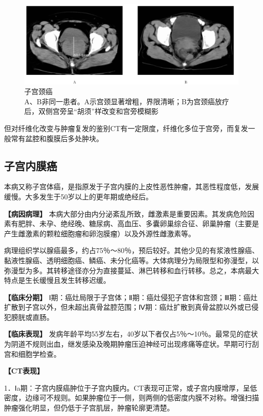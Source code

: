 \begin{figure}[!htbp]
 \centering
 \includegraphics[width=.7\textwidth,height=\textheight,keepaspectratio]{./images/Image00407.jpg}
 \captionsetup{justification=centering}
 \caption{子宫颈癌\\{\small A、B非同一患者。A示宫颈显著增粗，界限清晰；B为宫颈癌放疗后，双侧宫旁呈“胡须”样改变和宫旁模糊影}}
 \label{fig21-10}
  \end{figure} 

但对纤维化改变与肿瘤复发的鉴别CT有一定限度，纤维化多位于宫旁，而复发一般常有盆腔和腹膜后多处肿块。

\subsection{子宫内膜癌}

本病又称子宫体癌，是指原发于子宫内膜的上皮性恶性肿瘤，其恶性程度低，发展缓慢。大多发生于50岁以上的更年期或绝经后。

\textbf{【病因病理】}
本病大部分由内分泌紊乱所致，雌激素是重要因素。其发病危险因素有肥胖、未孕、绝经晚、糖尿病、高血压、多囊卵巢综合征、卵巢肿瘤（主要是产生雌激素的颗粒细胞瘤和卵泡膜瘤）以及外源性雌激素等。

病理组织学以腺癌最多，约占75％～80％，预后较好。其他少见的有浆液性腺癌、黏液性腺癌、透明细胞癌、鳞癌、未分化癌等。大体病理分为局限型和弥漫型，以弥漫型为多。其转移途径亦分为直接蔓延、淋巴转移和血行转移。总之，本病最大特点是生长缓慢且发生转移迟缓。

\textbf{【临床分期】}
Ⅰ期：癌灶局限于子宫体；Ⅱ期：癌灶侵犯子宫体和宫颈；Ⅲ期：癌灶扩散到子宫以外，但未超出真骨盆腔范围；Ⅳ期：癌灶扩散到真骨盆腔以外或已侵犯膀胱或直肠。

\textbf{【临床表现】}
发病年龄平均55岁左右，40岁以下者仅占5％～10％。最常见的症状为阴道不规则出血，继发感染及晚期肿瘤压迫神经可出现疼痛等症状。早期可行刮宫和细胞学检查。

\textbf{【CT表现】}

1．Ⅰa期：子宫内膜癌肿位于子宫内膜内。CT表现可正常，或子宫内膜增厚，呈低密度，边缘可不规则。如果肿瘤位于一侧，则两侧的低密度内膜不对称。增强扫描肿瘤强化明显，但仍低于子宫肌层，肿瘤轮廓更清楚。

